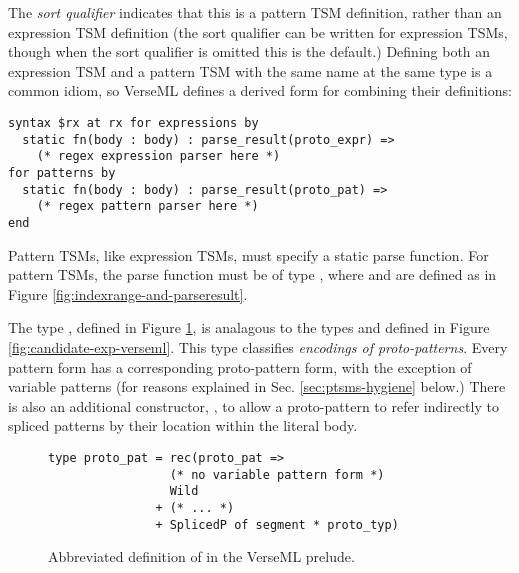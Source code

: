 {The \emph{sort qualifier}  indicates that this is a pattern TSM definition, rather than an expression TSM definition (the sort qualifier  can be written for expression TSMs, though when the sort qualifier is omitted this is the default.) Defining both an expression TSM and a pattern TSM with the same name at the same type is a common idiom, so VerseML defines a derived form for combining their definitions:
\begin{lstlisting}[numbers=none,morekeywords={andfor}]
syntax $rx at rx for expressions by
  static fn(body : body) : parse_result(proto_expr) => 
    (* regex expression parser here *)
for patterns by 
  static fn(body : body) : parse_result(proto_pat) => 
    (* regex pattern parser here *)
end
\end{lstlisting}

Pattern TSMs, like expression TSMs, must specify a static {parse function}. For pattern TSMs, the parse function must be of type , where  and  are defined as in Figure \ref{fig:indexrange-and-parseresult}. 

The type , defined in Figure \ref{fig:CEPat}, is analagous to the types  and  defined in Figure \ref{fig:candidate-exp-verseml}. This type classifies \emph{encodings of proto-patterns}. Every pattern form has a corresponding proto-pattern form, with the exception of variable patterns (for reasons explained in Sec. \ref{sec:ptsms-hygiene} below.) There is also an additional constructor, , to allow a proto-pattern to refer indirectly to spliced patterns by their location within the literal body.

\begin{figure}
\begin{lstlisting}[numbers=none]
type proto_pat = rec(proto_pat => 
                 (* no variable pattern form *) 
                 Wild
               + (* ... *)
               + SplicedP of segment * proto_typ)
\end{lstlisting}
\caption[Abbreviated definition of  in VerseML]{Abbreviated definition of  in the VerseML prelude.}
\label{fig:CEPat}
\end{figure}

}
